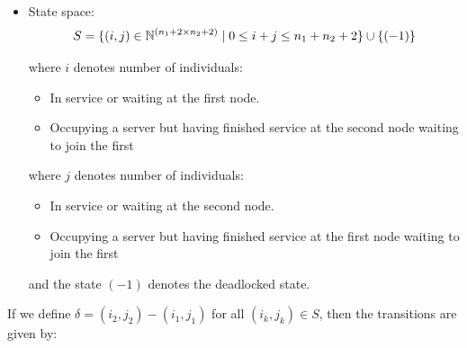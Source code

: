 \documentclass{article}
\begin{document}
\begin{itemize}
    \item State space:
        \[S = \{(i,j)\in\mathbb{N}^{(n_1+2\times n_2+2)} \nonscript\; | \nonscript\; 0 \leq i + j \leq n_1 + n_2 + 2
        \}\cup\{(-1)\}\]

        where \(i\) denotes number of individuals:
            \begin{itemize}
                \item In service or waiting at the first node.
                \item Occupying a server but having finished service at the
                    second node waiting to join the first
            \end{itemize}
        where \(j\) denotes number of individuals:
            \begin{itemize}
                \item In service or waiting at the second node.
                \item Occupying a server but having finished service at the
                    first node waiting to join the first
            \end{itemize}
        and the state $(-1)$ denotes the deadlocked state.
\end{itemize}

If we define $\delta = (i_2, j_2) - (i_1, j_1)$ for all $(i_k, j_k) \in S$, then the transitions are given by:
\end{document}
